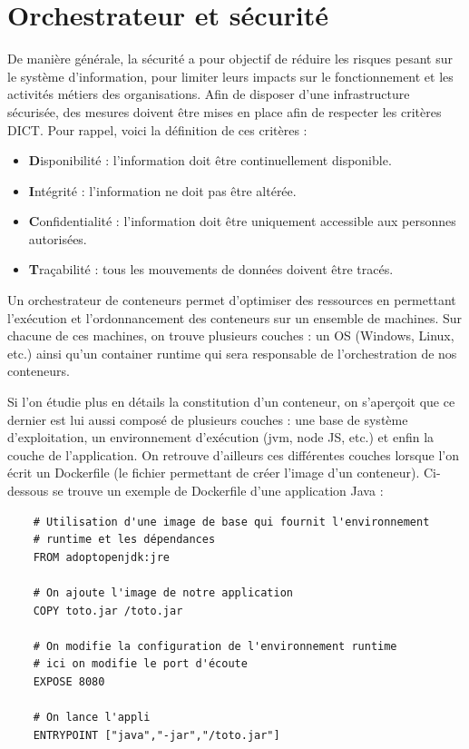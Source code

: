 \documentclass[11pt,fleqn]{book} %
\begin{document}
\chapter{Orchestrateur et sécurité} 
\label{securite}
\vspace{-2cm}
De manière générale, la sécurité  a  pour  objectif  de réduire  les  risques pesant  sur  le  système    d’information, pour limiter leurs impacts sur le  fonctionnement et les activités métiers des organisations. Afin de disposer d’une infrastructure sécurisée, des mesures doivent être mises en place afin de respecter les critères DICT. Pour rappel, voici la définition de ces critères :
\begin{itemize}
    \item \textbf{D}isponibilité : l’information doit être continuellement disponible.
    \item \textbf{I}ntégrité : l’information ne doit pas être altérée.
    \item \textbf{C}onfidentialité : l’information doit être uniquement accessible aux personnes autorisées.
    \item \textbf{T}raçabilité : tous les mouvements de données doivent être tracés.\newline
\end{itemize}

Un orchestrateur de conteneurs permet d'optimiser des ressources en permettant l'exécution et l'ordonnancement des conteneurs sur un ensemble de machines. Sur chacune de ces machines, on trouve plusieurs couches : un OS (Windows, Linux, etc.) ainsi qu'un container runtime qui sera responsable de l'orchestration de nos conteneurs.\newline

Si l'on étudie plus en détails la constitution d'un conteneur, on s'aperçoit que ce dernier est lui aussi composé de plusieurs couches : une base de système d'exploitation, un environnement d’exécution  (jvm, node JS, etc.) et enfin la couche de l'application.  On retrouve d'ailleurs ces différentes couches lorsque l'on écrit un Dockerfile (le fichier permettant de créer l'image d'un conteneur). Ci-dessous se trouve un exemple de Dockerfile d'une application Java :
\begin{verbatim}
    # Utilisation d'une image de base qui fournit l'environnement
    # runtime et les dépendances
    FROM adoptopenjdk:jre
    
    # On ajoute l'image de notre application
    COPY toto.jar /toto.jar
    
    # On modifie la configuration de l'environnement runtime 
    # ici on modifie le port d'écoute
    EXPOSE 8080
    
    # On lance l'appli
    ENTRYPOINT ["java","-jar","/toto.jar"]
\end{verbatim}
\end{document}
